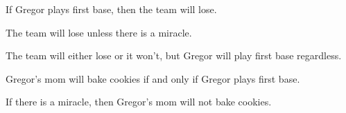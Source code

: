 \begin{earg}
\item If Gregor plays first base, then the team will lose. %
\item The team will lose unless there is a miracle. %
\item The team will either lose or it won't, but Gregor will play first base regardless. %
\item Gregor's mom will bake cookies if and only if Gregor plays first base.%
\item If there is a miracle, then Gregor's mom will not bake cookies. %
\end{earg}


